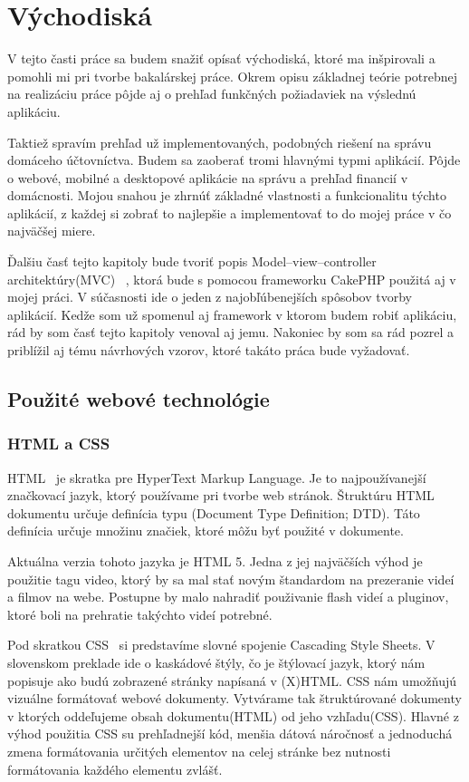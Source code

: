 \documentclass[12pt]{book}
\begin{document}
\chapter{Východiská}\label{chap:background}
V tejto časti práce sa budem snažiť opísať východiská, ktoré ma inšpirovali a pomohli mi pri tvorbe bakalárskej práce. Okrem opisu základnej teórie potrebnej na realizáciu práce pôjde aj o prehľad funkčných požiadaviek na výslednú aplikáciu.

Taktiež spravím prehľad už implementovaných, podobných riešení na správu domáceho účtovníctva. Budem sa zaoberať tromi hlavnými typmi aplikácií. Pôjde o webové, mobilné a desktopové aplikácie na správu a prehľad financií v domácnosti. Mojou snahou je zhrnúť základné vlastnosti a funkcionalitu týchto aplikácií, z každej si zobrať to najlepšie a implementovať to do mojej práce v čo najväčšej miere.

Ďalšiu časť tejto kapitoly bude tvoriť popis Model–view–controller architektúry(MVC) \cite{UvodMVC}\ , ktorá bude s pomocou frameworku CakePHP použitá aj v mojej práci. V súčasnosti ide o jeden z najobľúbenejších spôsobov tvorby aplikácií. Kedže som už spomenul aj framework v ktorom budem robiť aplikáciu, rád by som časť tejto kapitoly venoval aj jemu.
Nakoniec by som sa rád pozrel a priblížil aj tému návrhových vzorov, ktoré takáto práca bude vyžadovať.\newpage



\section{Použité webové technológie}
\subsection{HTML a CSS}
HTML \cite{HTML}\ je skratka pre HyperText Markup Language. Je to najpoužívanejší značkovací jazyk, ktorý používame pri tvorbe web stránok. Štruktúru HTML dokumentu určuje definícia typu (Document Type Definition; DTD). Táto definícia určuje množinu značiek, ktoré môžu byť použité v dokumente. 

Aktuálna verzia tohoto jazyka je HTML 5. Jedna z jej najväčších výhod je použitie tagu video, ktorý by sa mal stať novým štandardom na prezeranie videí a filmov na webe. Postupne by malo nahradiť použivanie flash videí a pluginov, ktoré boli na prehratie takýchto videí potrebné. 

Pod skratkou CSS \cite{CSS21}\ si predstavíme slovné spojenie Cascading Style Sheets. V slovenskom preklade ide o kaskádové štýly, čo je štýlovací jazyk, ktorý nám popisuje ako budú zobrazené stránky napísaná v (X)HTML. CSS nám umožňujú vizuálne formátovať webové dokumenty. Vytvárame tak štruktúrované dokumenty v ktorých oddeľujeme obsah dokumentu(HTML) od jeho vzhľadu(CSS). Hlavné z výhod použitia CSS su prehľadnejší kód, menšia dátová náročnosť a jednoduchá zmena formátovania určitých elementov na celej stránke bez nutnosti formátovania každého elementu zvlášť. 
\end{document}
